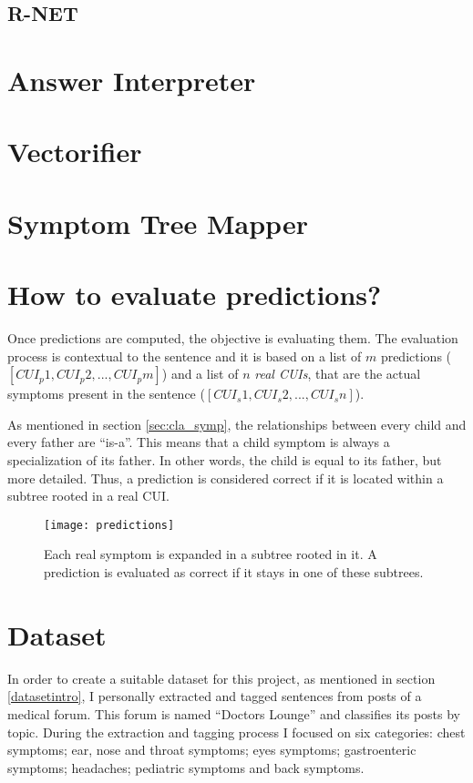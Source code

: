 \subsection{R-NET}



\section{Answer Interpreter}
\label{sec:answer_interpreter}



\section{Vectorifier}
\label{sec:vectorifier}



\section{Symptom Tree Mapper}
\label{sec:symptom_tree_mapper}



\section{How to evaluate predictions?}
\label{sec:eval_results}
Once predictions are computed, the objective is evaluating them. The evaluation process is contextual to the sentence and it is based on a list of $m$ predictions ($[CUI_{p}1, CUI_{p}2, ..., CUI_{p}m]$) and a list of $n$ \emph{real CUIs}, that are the actual symptoms present in the sentence ($[CUI_{s}1, CUI_{s}2, ..., CUI_{s}n]$).

As mentioned in section \ref{sec:cla_symp}, the relationships between every child and every father are ``is-a''. This means that a child symptom is always a specialization of its father. In other words, the child is equal to its father, but more detailed. Thus, a prediction is considered correct if it is located within a subtree rooted in a real CUI.

\begin{figure}[h]
\centering
\texttt{[image: predictions]}
\caption{Each real symptom is expanded in a subtree rooted in it. A prediction is evaluated as correct if it stays in one of these subtrees.}
\medskip
\end{figure}

\section{Dataset}
\label{sec:dataset}
In order to create a suitable dataset for this project, as mentioned in section \ref{datasetintro}, I personally extracted and tagged sentences from posts of a medical forum. This forum is named ``Doctors Lounge'' \cite{doctorslounge} and classifies its posts by topic. During the extraction and tagging process I focused on six categories: chest symptoms; ear, nose and throat symptoms; eyes symptoms; gastroenteric symptoms; headaches; pediatric symptoms and back symptoms.

